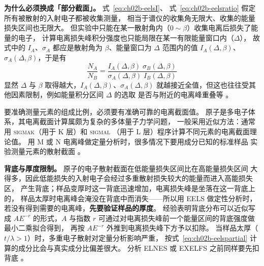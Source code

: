 \begin{principle}
\textbf{为什么必须换成「部分截面」。} 式~\eqref{eq:ch02b-eelsI}、
式~\eqref{eq:ch02b-eelsratio} 假定所有被散射的入射电子都被收集测量，
相当于谱仪的收集角无限大、收集的能量损失区间也无限大。
但实验中只能在某一散射角内（$0\sim\beta$）收集电离后损失了能量的电子，
计算电离损失峰积分强度也只能局限在某一有限能量窗口内（$\Delta$），
故式中的 $I_A$、$\sigma_A$ 都应是散射角为 $\beta$、能量窗口为 $\Delta$
范围内的值 $I_A(\Delta,\beta)$、$\sigma_A(\Delta,\beta)$，于是有
\begin{equation}
\frac{N_A}{N_B}
=\frac{I_A(\Delta,\beta)\;\sigma_B(\Delta,\beta)}
{\sigma_A(\Delta,\beta)\;I_B(\Delta,\beta)}
\label{eq:ch02b-eelspartial}
\end{equation}
显然 $\Delta$ 与 $\beta$ 取得越大，$I_A(\Delta,\beta)$、$\sigma_A(\Delta,\beta)$
就越接近全值，但这也往往受其他因素限制，例如能量积分区间 $\Delta$ 的选取
是否与附近的电离峰重叠等
。

要准确测量元素的组成比例，必须要有准确可靠的电离截面值。
原子是多电子体系，其电离截面计算属颇为复杂的多体量子力学问题，
一般采用近似方法：通常用 \textsc{sigmak}（用于 K 层）和 \textsc{sigmal}
（用于 L 层）程序计算不同元素的电离截面理论值。
用 M 或 N 电离峰做定量分析时，很多情况下要用成分已知的标准样品
实验测量元素的散射截面
。

\textbf{背底与厚度限制。} 原子的电子散射截面在低能量损失区间比在高能量损失区间
大得多，因此低能损失的入射电子会经过多重散射损失较大的能量而进入高能损失区，
产生背底；样品变厚时这一背底迅速增加，电离损失峰是坐落在这一背底上的，
样品太厚时电离峰会淹没在背底中而消失——所以用 EELS 做定性分析时，
若没有得到需要的电离峰，\textbf{先要验证样品的厚度}。
经验表明背底分布可以近似写成 $A E^{-r}$ 的形式，$A$ 与指数 $r$
可通过对电离损失峰前一个能量区间的背底强度做最小二乘拟合得到，
再按 $AE^{-r}$ 外推到电离损失峰下方予以扣除。
当样品太厚（$t/\lambda>1$）时，多重电子散射对定量分析影响严重，
按式~\eqref{eq:ch02b-eelspartial} 计算的成分比会与真实成分比偏差很大。
分析 ELNES 或 EXELFS 之前同样要先扣背底
。
\end{principle}

